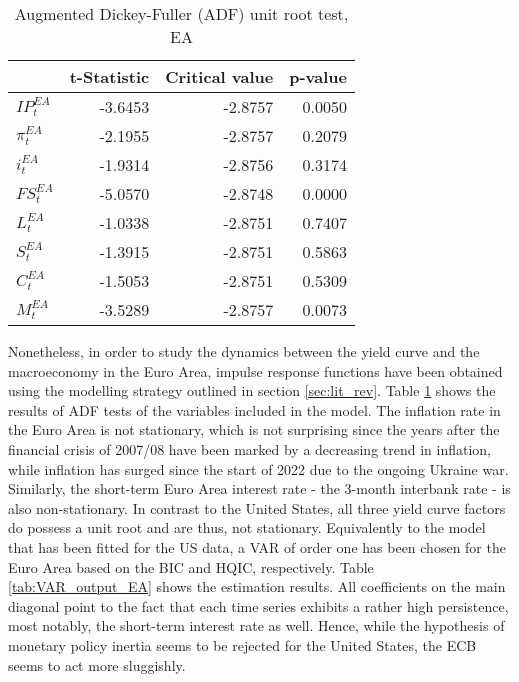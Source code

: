 


\begin{table}[ht]
    \centering
    \begin{tabular}{lrrr}
        \toprule
        {} &  t-Statistic &  Critical value &  p-value \\
        \midrule
        $IP^{EA}_{t}$  &      -3.6453 &         -2.8757 &   0.0050 \\
        $\pi^{EA}_{t}$ &      -2.1955 &         -2.8757 &   0.2079 \\
        $i^{EA}_{t}$   &      -1.9314 &         -2.8756 &   0.3174 \\
        $FS^{EA}_{t}$  &      -5.0570 &         -2.8748 &   0.0000 \\
        $L^{EA}_{t}$   &      -1.0338 &         -2.8751 &   0.7407 \\
        $S^{EA}_{t}$   &      -1.3915 &         -2.8751 &   0.5863 \\
        $C^{EA}_{t}$   &      -1.5053 &         -2.8751 &   0.5309 \\
        $M^{EA}_{t}$   &      -3.5289 &         -2.8757 &   0.0073 \\
        \bottomrule
    \end{tabular}
    \caption{Augmented Dickey-Fuller (ADF) unit root test, EA}
    \label{tab:adf_ea}
\end{table}


Nonetheless, in order to study the dynamics between the yield curve and the macroeconomy in the Euro Area, impulse response functions have been obtained using the modelling strategy outlined in section \ref{sec:lit_rev}. 
Table \ref{tab:adf_ea} shows the results of ADF tests of the variables included in the model. 
The inflation rate in the Euro Area is not stationary, which is not surprising since the years after the financial crisis of 2007/08 have been marked by a decreasing trend in inflation, while inflation has surged since the start of 2022 due to the ongoing Ukraine war. 
Similarly, the short-term Euro Area interest rate - the 3-month interbank rate - is also non-stationary.
In contrast to the United States, all three yield curve factors do possess a unit root and are thus, not stationary. 
Equivalently to the model that has been fitted for the US data, a VAR of order one has been chosen for the Euro Area based on the BIC and HQIC, respectively. 
Table \ref{tab:VAR_output_EA} shows the estimation results. 
All coefficients on the main diagonal point to the fact that each time series exhibits a rather high persistence, most notably, the short-term interest rate as well. 
Hence, while the hypothesis of monetary policy inertia seems to be rejected for the United States, the ECB seems to act more sluggishly. 

